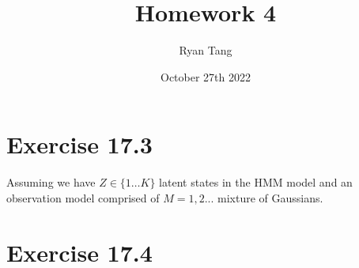 \documentclass[11pt, letterpaper]{article}
\title{Homework 4}
\author{Ryan Tang}
\date{October 27th 2022}
\begin{document}
\maketitle

\section{Exercise 17.3}
Assuming we have $Z \in \{1 \dots K\}$ latent states in the HMM model and an observation model comprised of $M = 1,2...$ mixture of Gaussians.

\section{Exercise 17.4}
\end{document}
